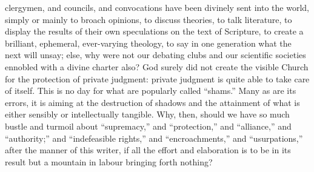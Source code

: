 clergymen, and councils, and convocations have been divinely sent into
the world, simply or mainly to broach opinions, to discuss theories,
to talk literature, to display the results of their own speculations
on the text of Scripture, to create a brilliant, ephemeral,
ever-varying theology, to say in one generation what the next will
unsay; else, why were not our debating clubs and our scientific
societies ennobled with a divine charter also? God surely did not
create the visible Church for the protection of private judgment:
private judgment is quite able to take care of itself. This is no day
for what are popularly called ``shams.'' Many as are its
errors, it is aiming at the destruction of shadows and the attainment
of what is either sensibly or intellectually tangible. Why, then,
should we have so much bustle and turmoil about ``supremacy,''
and ``protection,'' and ``alliance,'' and
``authority;'' and ``indefeasible rights,'' and
``encroachments,'' and ``usurpations,'' after the
manner of this writer, if all the effort and elaboration is to be in
its result but a mountain in labour bringing forth nothing?

